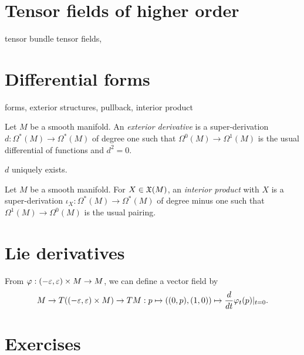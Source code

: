 \documentclass{../../large}
\begin{document}
\section{Tensor fields of higher order}
tensor bundle
tensor fields,

\section{Differential forms}
forms, exterior structures, pullback, interior product
\begin{prb}
Let $M$ be a smooth manifold.
An \emph{exterior derivative} is a super-derivation $d:\Omega^*(M)\to\Omega^*(M)$ of degree one such that $\Omega^0(M)\to\Omega^1(M)$ is the usual differential of functions and $d^2=0$.
\begin{parts}
\item $d$ uniquely exists.
\end{parts}
\end{prb}

\begin{prb}
Let $M$ be a smooth manifold.
For $X\in\mathfrak{X}(M)$, an \emph{interior product} with $X$ is a super-derivation $\iota_X:\Omega^*(M)\to\Omega^*(M)$ of degree minus one such that $\Omega^1(M)\to\Omega^0(M)$ is the usual pairing.
\end{prb}

\section{Lie derivatives}

\begin{prb}
From $\varphi:(-\varepsilon,\varepsilon)\times M\to M$, we can define a vector field by
\[M\to T((-\varepsilon,\varepsilon)\times M)\to TM:p\mapsto((0,p),(1,0))\mapsto\frac d{dt}\varphi_t(p)|_{t=0}.\]

\end{prb}



\section*{Exercises}
\begin{prb}[Orientation]
\end{prb}
\end{document}

